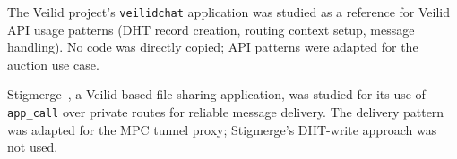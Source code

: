 The Veilid project's \texttt{veilidchat} application was studied as a reference for Veilid API usage patterns (DHT record creation, routing context setup, message handling). No code was directly copied; API patterns were adapted for the auction use case.

Stigmerge~\cite{stigmerge2024}, a Veilid-based file-sharing application, was studied for its use of \texttt{app\_call} over private routes for reliable message delivery. The delivery pattern was adapted for the MPC tunnel proxy; Stigmerge's DHT-write approach was not used.
